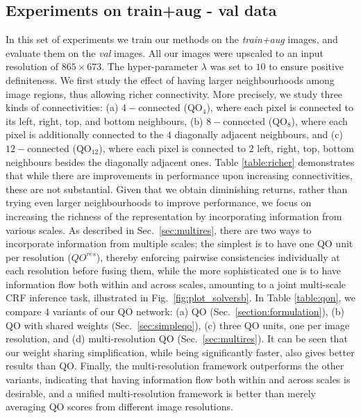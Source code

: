 \documentclass[runningheads]{llncs}
\newcommand{\reffig}[1]{Fig.~\ref{#1}}
\newcommand{\refsec}[1]{Sec.~{\ref{#1}}}
\begin{document}
\subsection{Experiments on train+aug - val data} 
\label{subsec:prelim}
In this set of experiments we train our methods on the \emph{train+aug} images, and evaluate them on the \emph{val} images.
All our images were upscaled to an input resolution of $865 \times 673$. 
The hyper-parameter $\lambda$ was set to $10$ to ensure positive definiteness.
We first study the effect of having larger neighbourhoods among image regions, thus allowing richer connectivity. More precisely, we study three kinds of connectivities: (a) $4-$connected (QO$_4$), where each pixel
is connected to its left, right, top, and bottom neighbours, (b) $8-$connected (QO$_8$), where each pixel is additionally connected to the $4$ diagonally adjacent neighbours, and (c) $12-$connected (QO$_{12}$), where each pixel
is connected to $2$ left, right, top, bottom neighbours besides the diagonally adjacent ones. Table \ref{table:richer} demonstrates that while there are improvements in performance upon increasing
connectivities, these are not substantial. Given that we obtain diminishing returns, rather than trying even larger neighbourhoods to improve performance, we focus on increasing the richness of the representation 
by incorporating information from various scales. As described in \refsec{sec:multires}, there are two ways to incorporate information from multiple scales; the simplest is to have one QO unit per resolution ($QO^{res}$), 
thereby enforcing pairwise consistencies individually at each resolution before fusing them, 
while the more sophisticated one is to have information flow both within and across scales, amounting to a joint multi-scale CRF inference task, illustrated in \reffig{fig:plot_solversb}. 
In Table \ref{table:qon}, we compare $4$ variants of our QO network: (a) QO (Sec.~\ref{section:formulation}), (b) QO with shared weights (Sec.~\ref{sec:simpleqo}),
(c) three QO units, one per image resolution, and (d) multi-resolution QO (Sec.~\ref{sec:multires}). It can be seen that our weight sharing simplification, while being significantly faster, also gives better results than QO. 
Finally, the multi-resolution framework outperforms the other variants, indicating that having information flow both within and across scales is desirable, and a unified multi-resolution framework is better than merely averaging QO scores from different
image resolutions.
\end{document}
